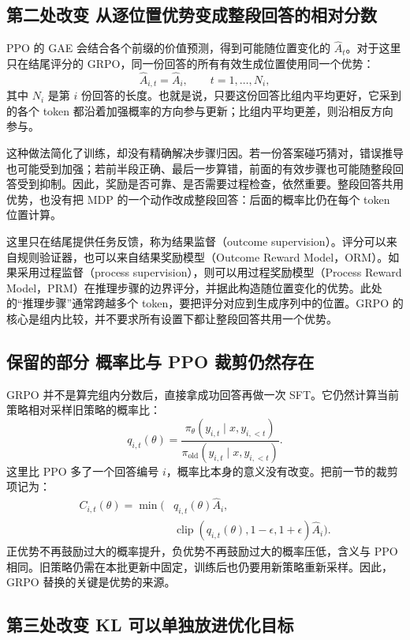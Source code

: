 \subsection{第二处改变 从逐位置优势变成整段回答的相对分数}

PPO 的 GAE 会结合各个前缀的价值预测，得到可能随位置变化的 $\widehat A_t$。对于这里只在结尾评分的 GRPO，同一份回答的所有有效生成位置使用同一个优势：
\[
    \widehat A_{i,t}=\widehat A_i,
    \qquad t=1,\ldots,N_i,
\]
其中 $N_i$ 是第 $i$ 份回答的长度。也就是说，只要这份回答比组内平均更好，它采到的各个 token 都沿着加强概率的方向参与更新；比组内平均更差，则沿相反方向参与。

这种做法简化了训练，却没有精确解决步骤归因。若一份答案碰巧猜对，错误推导也可能受到加强；若前半段正确、最后一步算错，前面的有效步骤也可能随整段回答受到抑制。因此，奖励是否可靠、是否需要过程检查，依然重要。整段回答共用优势，也没有把 MDP 的一个动作改成整段回答：后面的概率比仍在每个 token 位置计算。

这里只在结尾提供任务反馈，称为结果监督（outcome supervision）。评分可以来自规则验证器，也可以来自结果奖励模型（Outcome Reward Model，ORM）。如果采用过程监督（process supervision），则可以用过程奖励模型（Process Reward Model，PRM）在推理步骤的边界评分，并据此构造随位置变化的优势。此处的``推理步骤''通常跨越多个 token，要把评分对应到生成序列中的位置。GRPO 的核心是组内比较，并不要求所有设置下都让整段回答共用一个优势。

\subsection{保留的部分 概率比与 PPO 裁剪仍然存在}

GRPO 并不是算完组内分数后，直接拿成功回答再做一次 SFT。它仍然计算当前策略相对采样旧策略的概率比：
\[
    q_{i,t}(\theta)=
    \frac{\pi_\theta(y_{i,t}\mid x,y_{i,<t})}
         {\pi_{\mathrm{old}}(y_{i,t}\mid x,y_{i,<t})}.
\]
这里比 PPO 多了一个回答编号 $i$，概率比本身的意义没有改变。把前一节的裁剪项记为：
\[
\begin{split}
    C_{i,t}(\theta)=\min\big(&q_{i,t}(\theta)\widehat A_i,\\
       &\operatorname{clip}(q_{i,t}(\theta),1-\epsilon,1+\epsilon)
                        \widehat A_i\big).
\end{split}
\]
正优势不再鼓励过大的概率提升，负优势不再鼓励过大的概率压低，含义与 PPO 相同。旧策略仍需在本批更新中固定，训练后也仍要用新策略重新采样。因此，GRPO 替换的关键是优势的来源。

\subsection{第三处改变 KL 可以单独放进优化目标}

